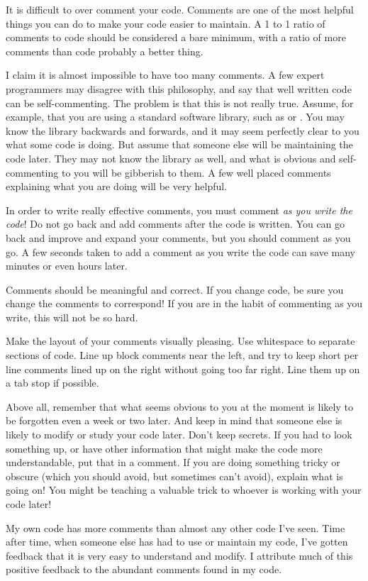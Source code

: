 It is difficult to over comment your code. Comments are
one of the most helpful things you can do to make your code
easier to maintain. A 1 to 1 ratio of comments to code should
be considered a bare minimum, with a ratio of more comments than
code probably a better thing.

I claim it is almost impossible to have too many comments. A few
expert programmers may disagree with this philosophy, and say that
well written code can be self-commenting. The problem is that
this is not really true. Assume, for example, that you are using
a standard software library, such as  or \V\@. You may know the
library backwards and forwards, and it may seem perfectly clear
to you what some code is doing. But assume that someone else
will be maintaining the code later. They may not know the library
as well, and what is obvious and self-commenting to you will
be gibberish to them. A few well placed comments explaining what
you are doing will be very helpful.

In order to write really effective comments, you must
comment \emph{as you write the code}! Do not go back and
add comments after the code is written. You can go back and
improve and expand your comments, but you should comment as
you go. A few seconds taken to add a comment as you write the
code can save many minutes or even hours later.

Comments should be meaningful and correct. If you change code,
be sure you change the comments to correspond! If you are in the
habit of commenting as you write, this will not be so hard.

Make the layout of your comments visually pleasing. Use whitespace
to separate sections of code. Line up block comments near the
left, and try to keep short per line comments lined up on
the right without going too far right. Line them up on a tab
stop if possible.

Above all, remember that what seems obvious to you at the moment
is likely to be forgotten even a week or two later.  And keep in
mind that someone else is likely to modify or study your code
later.  Don't keep secrets. If you had to look something up, or
have other information that might make the code more
understandable, put that in a comment.  If you are doing
something tricky or obscure (which you should avoid, but
sometimes can't avoid), explain what is going on! You might be
teaching a valuable trick to whoever is working with your code
later!

My own code has more comments than almost any other code I've seen.
Time after time, when someone else has had to use or maintain my
code, I've gotten feedback that it is very easy to understand and
modify. I attribute much of this positive feedback to the abundant
comments found in my code.


